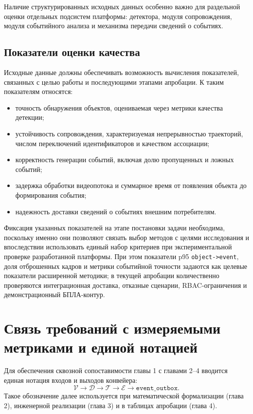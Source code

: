Наличие структурированных исходных данных особенно важно для раздельной оценки отдельных подсистем платформы: детектора, модуля сопровождения, модуля событийного анализа и механизма передачи сведений о событиях.

\subsection{Показатели оценки качества}

Исходные данные должны обеспечивать возможность вычисления показателей, связанных с целью работы и последующими этапами апробации. К таким показателям относятся:
\begin{itemize}
    \item точность обнаружения объектов, оцениваемая через метрики качества детекции;
    \item устойчивость сопровождения, характеризуемая непрерывностью траекторий, числом переключений идентификаторов и качеством ассоциации;
    \item корректность генерации событий, включая долю пропущенных и ложных событий;
    \item задержка обработки видеопотока и суммарное время от появления объекта до формирования события;
    \item надежность доставки сведений о событиях внешним потребителям.
\end{itemize}

Фиксация указанных показателей на этапе постановки задачи необходима, поскольку именно они позволяют связать выбор методов с целями исследования и впоследствии использовать единый набор критериев при экспериментальной проверке разработанной платформы. При этом показатели p95 \texttt{object->event}, доля отброшенных кадров и метрики событийной точности задаются как целевые показатели расширенной методики; в текущей апробации количественно проверяются интеграционная доставка, отказные сценарии, RBAC-ограничения и демонстрационный БПЛА-контур.

\section{Связь требований с измеряемыми метриками и единой нотацией}

Для обеспечения сквозной сопоставимости главы 1 с главами 2--4 вводится единая нотация входов и выходов конвейера:
\begin{equation}
\mathcal{V} \rightarrow \mathcal{D} \rightarrow \mathcal{T} \rightarrow \mathcal{E} \rightarrow \texttt{event\_outbox}.
\end{equation}
\where
{}
Такое обозначение далее используется при математической формализации (глава 2), инженерной реализации (глава 3) и в таблицах апробации (глава 4).

